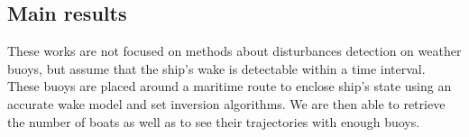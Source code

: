 \documentclass[14pt, a4paper]{article}
\begin{document}
	\subsection*{Main results}
		These works are not focused on methods about disturbances detection on weather buoys, but assume that the ship's wake is detectable within a time interval. These buoys are placed around a maritime route to enclose ship's state using an accurate wake model and set inversion algorithms. We are then able to retrieve the number of boats as well as to see their trajectories with enough buoys.
		
	\printbibliography[title={References},heading=subbibliography]

	\medskip
\end{document}
